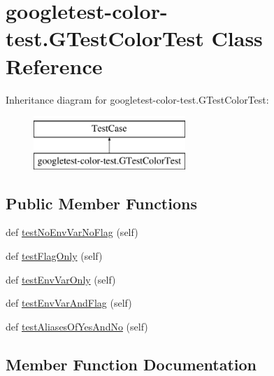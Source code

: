 \hypertarget{classgoogletest-color-test_1_1GTestColorTest}{}\section{googletest-\/color-\/test.G\+Test\+Color\+Test Class Reference}
\label{classgoogletest-color-test_1_1GTestColorTest}
Inheritance diagram for googletest-\/color-\/test.G\+Test\+Color\+Test\+:\begin{figure}[H]
\begin{center}
\leavevmode
\includegraphics[height=2.000000cm]{classgoogletest-color-test_1_1GTestColorTest}
\end{center}
\end{figure}
\subsection*{Public Member Functions}
\begin{DoxyCompactItemize}
\item 
def \mbox{\hyperlink{classgoogletest-color-test_1_1GTestColorTest_ae36014618c6afc19fa6d77babf8faa88}{test\+No\+Env\+Var\+No\+Flag}} (self)
\item 
def \mbox{\hyperlink{classgoogletest-color-test_1_1GTestColorTest_ade41e99b5486c9d947d9b817210174f6}{test\+Flag\+Only}} (self)
\item 
def \mbox{\hyperlink{classgoogletest-color-test_1_1GTestColorTest_a1f0a2bab46c123e865a821307bd689de}{test\+Env\+Var\+Only}} (self)
\item 
def \mbox{\hyperlink{classgoogletest-color-test_1_1GTestColorTest_a8f6cbbaa18feb66b8b03e6cc1f493f49}{test\+Env\+Var\+And\+Flag}} (self)
\item 
def \mbox{\hyperlink{classgoogletest-color-test_1_1GTestColorTest_a82dd36b6a0fa82d417b7ec5e660c6e41}{test\+Aliases\+Of\+Yes\+And\+No}} (self)
\end{DoxyCompactItemize}


\subsection{Member Function Documentation}
\mbox{\label{classgoogletest-color-test_1_1GTestColorTest_a82dd36b6a0fa82d417b7ec5e660c6e41}} 
